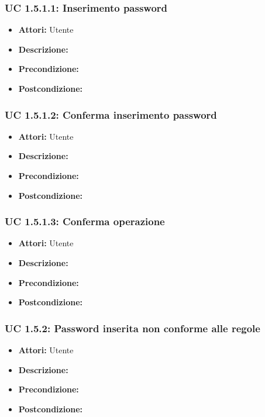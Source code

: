 \subsubsection{UC 1.5.1.1: Inserimento password}

\begin{itemize}
\item \textbf{Attori:} Utente
\item \textbf{Descrizione:} 
\item \textbf{Precondizione:} 
\item \textbf{Postcondizione:} 
\end{itemize}

\subsubsection{UC 1.5.1.2: Conferma inserimento password }

\begin{itemize}
\item \textbf{Attori:} Utente
\item \textbf{Descrizione:} 
\item \textbf{Precondizione:} 
\item \textbf{Postcondizione:} 
\end{itemize}

\subsubsection{UC 1.5.1.3: Conferma operazione}

\begin{itemize}
\item \textbf{Attori:} Utente
\item \textbf{Descrizione:} 
\item \textbf{Precondizione:} 
\item \textbf{Postcondizione:} 
\end{itemize}

\subsubsection{UC 1.5.2: Password inserita non conforme alle regole}

\begin{itemize}
\item \textbf{Attori:} Utente
\item \textbf{Descrizione:} 
\item \textbf{Precondizione:} 
\item \textbf{Postcondizione:} 
\end{itemize}

